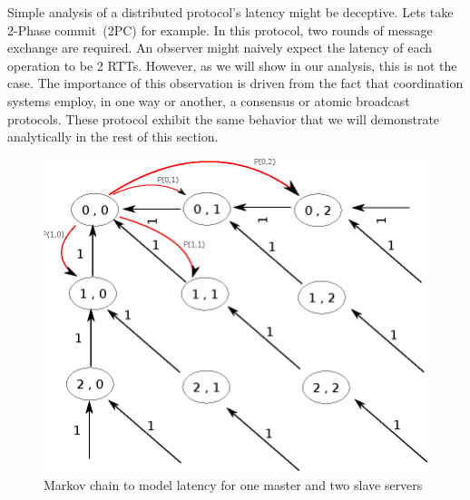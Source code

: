 Simple analysis of a distributed protocol's latency might be deceptive. Lets take 2-Phase commit~(2PC) for example. In this protocol, two rounds of message exchange are required. An observer might naively expect the latency of each operation to be 2 RTTs. However, as we will show in our analysis, this is not the case. The importance of this observation is driven from the fact that coordination systems employ, in one way or another, a consensus or atomic broadcast protocols. These protocol exhibit the same behavior that we will demonstrate analytically in the rest of this section.

\begin{figure}[ht]
\centering
\includegraphics[scale=0.8]{img/markov_general.eps}
\caption{Markov chain to model latency for one master and two slave servers}
\label{fig:markovgeneral}
\end{figure}

